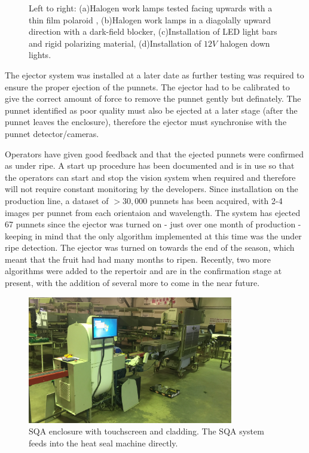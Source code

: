 \documentclass[fleqn,twoside]{article}
\begin{document}
\begin{figure}[h]
\begin{subfigure}{.35\textwidth}
		\caption{}
		\label{fig:production_LED_Hal}
	\end{subfigure}%
	
	\caption{Left to right: (a)Halogen work lamps tested facing upwards with a thin film polaroid , (b)Halogen work lamps in a diagolally upward direction with a dark-field blocker, (c)Installation of LED light bars and rigid polarizing material, (d)Installation of $12V$ halogen down lights.}
	\label{fig:test3}
\end{figure}


The ejector system was installed at a later date as further testing was required to ensure the proper ejection of the punnets. The ejector had to be calibrated to give the correct amount of force to remove the punnet gently but definately. The punnet identified as poor quality must also be ejected at a later stage (after the punnet leaves the enclosure), therefore the ejector must synchronise with the punnet detector/cameras.

Operators have given good feedback and that the ejected punnets were confirmed as under ripe. A start up procedure has been documented and is in use so that the operators can start and stop the vision system when required and therefore will not require constant monitoring by the developers. Since installation on the production line, a dataset of $>30,000$ punnets has been acquired, with 2-4 images per punnet from each orientaion and wavelength. The system has ejected 67 punnets since the ejector was turned on - just over one month of production - keeping in mind that the only algorithm implemented at this time was the under ripe detection. The ejector was turned on towards the end of the season, which meant that the fruit had had many months to ripen. Recently, two more algorithms were added to the repertoir and are in the confirmation stage at present, with the addition of several more to come in the near future.


\begin{figure}[ht]
	\centering
	\includegraphics[width=0.8\textwidth]{images/production_final.JPG}
	\caption{SQA enclosure with touchscreen and cladding. The SQA system feeds into the heat seal machine directly.}
	\label{fig:production_final}
\end{figure}
\end{document}
